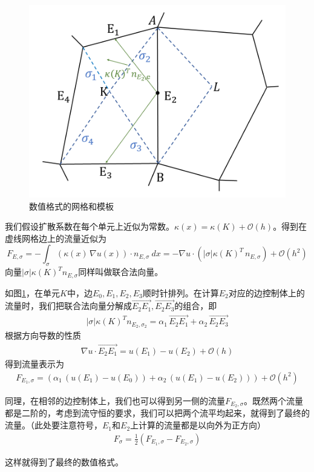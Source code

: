 \documentclass[12pt,a4paper]{article}
\theoremstyle{plain}
\begin{document}
\begin{figure}[h]
\centering
\includegraphics[width=0.5\linewidth]{stencil.png}
\caption{数值格式的网格和模板}
\label{f1}
\end{figure}

我们假设扩散系数在每个单元上近似为常数。$\kappa(x) = \kappa(K) + \mathcal{O}(h)$。得到在虚线网格边上的流量近似为
\begin{equation*}
F_{E, \sigma} = - \int_{\sigma} (\kappa(x) \, \nabla u(x)) \cdot n_{E, \sigma} \ dx = - \nabla u \cdot (|\sigma| \kappa(K)^T \, n_{E, \sigma}) + \mathcal{O}(h^2)
\end{equation*}
向量$|\sigma| \kappa(K)^T n_{E, \sigma}$同样叫做联合法向量。

如图\ref{f1}，在单元$K$中，边$E_0,E_1,E_2,E_3$顺时针排列。在计算$E_2$对应的边控制体上的流量时，我们把联合法向量分解成$\overrightarrow{E_2 E_1}, \overrightarrow{E_2 E_3}$的组合，即
\begin{align*}
|\sigma| \kappa(K)^T n_{E_2, \sigma_2} = \alpha_1 \, \overrightarrow{E_2 E_1} + \alpha_2 \, \overrightarrow{E_2 E_3}
\end{align*}
根据方向导数的性质
\begin{align*}
\nabla u \cdot \overrightarrow{E_2 E_1} = u(E_1) - u(E_2) + \mathcal{O}(h)
\end{align*}
得到流量表示为
\begin{align*}
F_{E_1, \sigma} = (\alpha_{1} \, (u(E_1) - u(E_0)) + \alpha_{2} \, (u(E_1) - u(E_2))) + \mathcal{O}(h^2)
\end{align*}

同理，在相邻的边控制体上，我们也可以得到另一侧的流量$F_{E_2, \sigma}$。既然两个流量都是二阶的，考虑到流守恒的要求，我们可以把两个流平均起来，就得到了最终的流量。（此处要注意符号，$E_1$和$E_2$上计算的流量都是以向外为正方向）
\begin{align*}
F_{\sigma} = \frac12 (F_{E_1, \sigma} - F_{E_2, \sigma})
\end{align*}

这样就得到了最终的数值格式。
\end{document}
